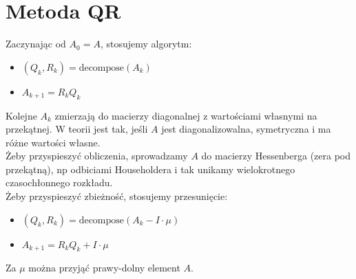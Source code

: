 \section{Metoda QR}
Zaczynając od \( A_0 = A \), stosujemy algorytm:
\begin{itemize}
	\onehalfspacing
	\item \( (Q_k, R_k) = \text{decompose}(A_k) \)
	\item \( A_{k+1} = R_kQ_k \)
\end{itemize}
Kolejne \( A_k \) zmierzają do macierzy diagonalnej z wartościami własnymi na przekątnej. W teorii jest tak, jeśli \( A \) jest diagonalizowalna, symetryczna i ma różne wartości własne. \\
Żeby przyspieszyć obliczenia, sprowadzamy \( A \) do macierzy Hessenberga (zera pod przekątną), np odbiciami Householdera i tak unikamy wielokrotnego czasochłonnego rozkładu. \\
Żeby przyspieszyć zbieżność, stosujemy przesunięcie:
\begin{itemize}
	\onehalfspacing
	\item \( (Q_k, R_k) = \text{decompose}(A_k - I \cdot \mu) \)
	\item \( A_{k+1} = R_kQ_k + I \cdot \mu \)
\end{itemize}
Za \( \mu \) można przyjąć prawy-dolny element \( A \).